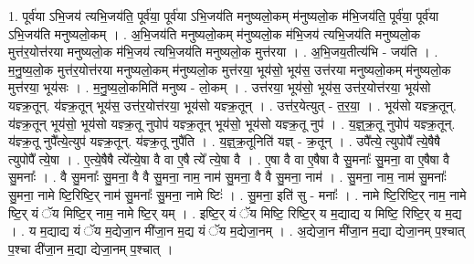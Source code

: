 \documentclass[17pt]{extarticle}
\begin{document}
1. पूर्व॑या ऽभि॒जय॑ त्यभि॒जय॑ति॒ पूर्व॑या॒ पूर्व॑या ऽभि॒जय॑ति मनुष्यलो॒कम् म॑नुष्यलो॒क म॑भि॒जय॑ति॒ पूर्व॑या॒ पूर्व॑या ऽभि॒जय॑ति मनुष्यलो॒कम् । . अ॒भि॒जय॑ति मनुष्यलो॒कम् म॑नुष्यलो॒क म॑भि॒जय॑ त्यभि॒जय॑ति मनुष्यलो॒क मुत्त॑र॒योत्त॑रया मनुष्यलो॒क म॑भि॒जय॑ त्यभि॒जय॑ति मनुष्यलो॒क मुत्त॑रया । . अ॒भि॒जय॒तीत्य॑भि - जय॑ति । . म॒नु॒ष्य॒लो॒क मुत्त॑र॒योत्त॑रया मनुष्यलो॒कम् म॑नुष्यलो॒क मुत्त॑रया॒ भूय॑सो॒ भूय॑स॒ उत्त॑रया मनुष्यलो॒कम् म॑नुष्यलो॒क मुत्त॑रया॒ भूय॑सः । . म॒नु॒ष्य॒लो॒कमिति॑ मनुष्य - लो॒कम् । . उत्त॑रया॒ भूय॑सो॒ भूय॑स॒ उत्त॑र॒योत्त॑रया॒ भूय॑सो यज्ञ्क्र॒तून्. य॑ज्ञ्क्र॒तून् भूय॑स॒ उत्त॑र॒योत्त॑रया॒ भूय॑सो यज्ञ्क्र॒तून् । . उत्त॑र॒येत्युत् - त॒र॒या॒ । . भूय॑सो यज्ञ्क्र॒तून्. य॑ज्ञ्क्र॒तून् भूय॑सो॒ भूय॑सो यज्ञ्क्र॒तू नुपोप॑ यज्ञ्क्र॒तून् भूय॑सो॒ भूय॑सो यज्ञ्क्र॒तू नुप॑ । . य॒ज्ञ्॒क्र॒तू नुपोप॑ यज्ञ्क्र॒तून्. य॑ज्ञ्क्र॒तू नुपै᳚त्ये॒त्युप॑ यज्ञ्क्र॒तून्. य॑ज्ञ्क्र॒तू नुपै॑ति । . य॒ज्ञ्॒क्र॒तूनिति॑ यज्ञ् - क्र॒तून् । . उपै᳚त्ये॒ त्युपोपै᳚ त्ये॒षैषै त्युपोपै᳚ त्ये॒षा । . ए॒त्ये॒षैषै त्ये᳚त्ये॒षा वै वा ए॒षै त्ये᳚ त्ये॒षा वै । . ए॒षा वै वा ए॒षैषा वै सु॒मनाः᳚ सु॒मना॒ वा ए॒षैषा वै सु॒मनाः᳚ । . वै सु॒मनाः᳚ सु॒मना॒ वै वै सु॒मना॒ नाम॒ नाम॑ सु॒मना॒ वै वै सु॒मना॒ नाम॑ । . सु॒मना॒ नाम॒ नाम॑ सु॒मनाः᳚ सु॒मना॒ नामे ष्टि॒रिष्टि॒र् नाम॑ सु॒मनाः᳚ सु॒मना॒ नामे ष्टिः॑ । . सु॒मना॒ इति॑ सु - मनाः᳚ । . नामे ष्टि॒रिष्टि॒र् नाम॒ नामे ष्टि॒र् यं ॅय मिष्टि॒र् नाम॒ नामे ष्टि॒र् यम् । . इष्टि॒र् यं ॅय मिष्टि॒ रिष्टि॒र् य म॒द्याद्य य मिष्टि॒ रिष्टि॒र् य म॒द्य । . य म॒द्याद्य यं ॅय म॒द्येजा॒न मी॑जा॒न म॒द्य यं ॅय म॒द्येजा॒नम् । . अ॒द्येजा॒न मी॑जा॒न म॒द्या द्येजा॒नम् प॒श्चात् प॒श्चा दी॑जा॒न म॒द्या द्येजा॒नम् प॒श्चात् । \newline
\end{document}
